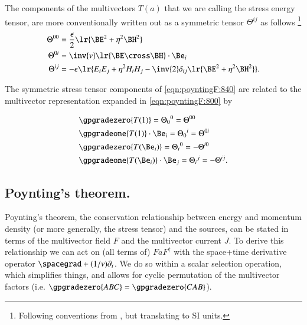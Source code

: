 The components of the multivectors \( T(a) \) that we are calling the stress energy tensor, are more conventionally written out
as a symmetric tensor \( \Theta^{ij} \) as follows
\footnote{Following conventions from \citep{jackson1975cew}, but translating to SI units.}
\begin{dmath}\label{eqn:poyntingF:840}
\begin{aligned}
\Theta^{00} &= \frac{\epsilon}{2} \lr{ \BE^2 + \eta^2 \BH^2 } \\
\Theta^{0i} &= \inv{v} \lr{ \BE \cross \BH } \cdot \Be_i \\
\Theta^{ij} &= -\epsilon \lr{ E_i E_j + \eta^2 H_i H_j - \inv{2} \delta_{ij} \lr{ \BE^2 + \eta^2 \BH^2 } }.
\end{aligned}
\end{dmath}

The symmetric stress tensor components of \cref{eqn:poyntingF:840}
are related to the multivector representation expanded in \cref{eqn:poyntingF:800} by

\begin{dmath}\label{eqn:poyntingF:820}
\begin{aligned}
&\gpgradezero{ T(1) }
=
{\Theta_0}^0 = \Theta^{00} \\
&\gpgradeone{ T(1) } \cdot \Be_i
= {\Theta_0}^i = \Theta^{0i} \\
&\gpgradezero{ T(\Be_i) }
= {\Theta_i}^0 = -\Theta^{i0} \\
&\gpgradeone{ T(\Be_i) } \cdot \Be_j = {\Theta_i}^j = -\Theta^{ij}.
\end{aligned}
\end{dmath}

\subsection{Poynting's theorem.}

Poynting's theorem, the conservation relationship between energy and momentum density (or more generally, the stress tensor) and the sources, can be stated in terms of the multivector field \( F \) and the multivector current \( J \).
To derive this relationship we can act on (all terms of) \( F a F^\dagger \) with the space+time derivative operator \( \spacegrad + (1/v) \partial_t \).
We do so within a scalar selection operation, which simplifies things, and allows for cyclic permutation of the multivector factors (i.e. \(\gpgradezero{ABC} = \gpgradezero{CAB}\)).

